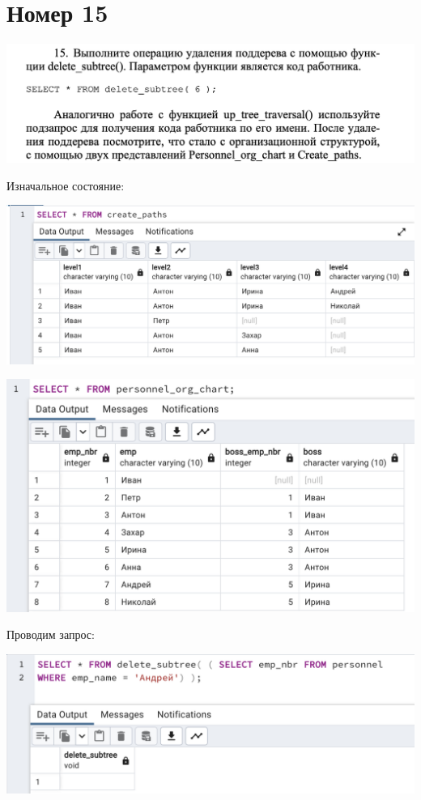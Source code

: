 \documentclass[a4paper,12pt]{article}
\begin{document}
\section*{Номер 15}
\begin{flushleft}
\includegraphics[scale=0.5]{15_1.png}
\end{flushleft}
Изначальное состояние:
\begin{flushleft}
\includegraphics[scale=0.5]{15_2.png}
\end{flushleft}
\begin{flushleft}
\includegraphics[scale=0.6]{15_3.png}
\end{flushleft}
Проводим запрос:
\begin{flushleft}
\includegraphics[scale=0.5]{15_4.png}
\end{flushleft}
\end{document}

